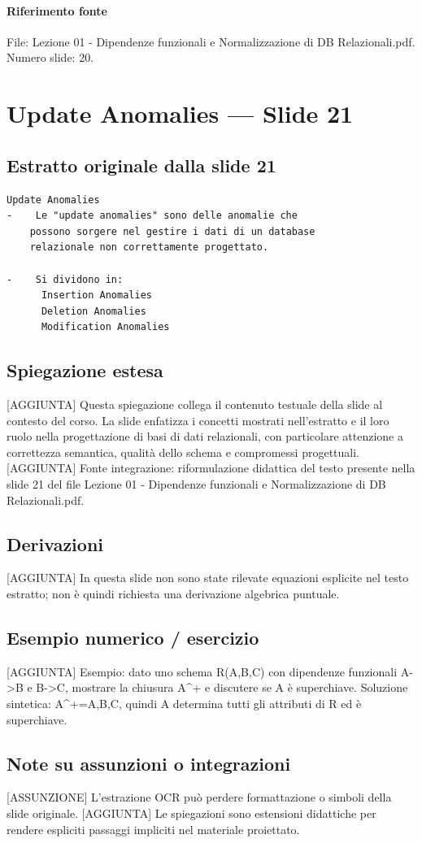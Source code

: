 \documentclass[11pt]{article}
\begin{document}
\paragraph{Riferimento fonte} File: Lezione 01 - Dipendenze funzionali e Normalizzazione di DB Relazionali.pdf. Numero slide: 20.
\section{Update Anomalies --- Slide 21}
\subsection*{Estratto originale dalla slide 21}
\begin{lstlisting}
Update Anomalies
-    Le "update anomalies" sono delle anomalie che
    possono sorgere nel gestire i dati di un database
    relazionale non correttamente progettato.

-    Si dividono in:
      Insertion Anomalies
      Deletion Anomalies
      Modification Anomalies
\end{lstlisting}
\subsection*{Spiegazione estesa}
[AGGIUNTA] Questa spiegazione collega il contenuto testuale della slide al contesto del corso. La slide enfatizza i concetti mostrati nell'estratto e il loro ruolo nella progettazione di basi di dati relazionali, con particolare attenzione a correttezza semantica, qualità dello schema e compromessi progettuali.
[AGGIUNTA] Fonte integrazione: riformulazione didattica del testo presente nella slide 21 del file Lezione 01 - Dipendenze funzionali e Normalizzazione di DB Relazionali.pdf.
\subsection*{Derivazioni}
[AGGIUNTA] In questa slide non sono state rilevate equazioni esplicite nel testo estratto; non è quindi richiesta una derivazione algebrica puntuale.
\subsection*{Esempio numerico / esercizio}
[AGGIUNTA] Esempio: dato uno schema R(A,B,C) con dipendenze funzionali A->B e B->C, mostrare la chiusura A^+ e discutere se A è superchiave. Soluzione sintetica: A^+={A,B,C}, quindi A determina tutti gli attributi di R ed è superchiave.
\subsection*{Note su assunzioni o integrazioni}
[ASSUNZIONE] L'estrazione OCR può perdere formattazione o simboli della slide originale.
[AGGIUNTA] Le spiegazioni sono estensioni didattiche per rendere espliciti passaggi impliciti nel materiale proiettato.
\end{document}
